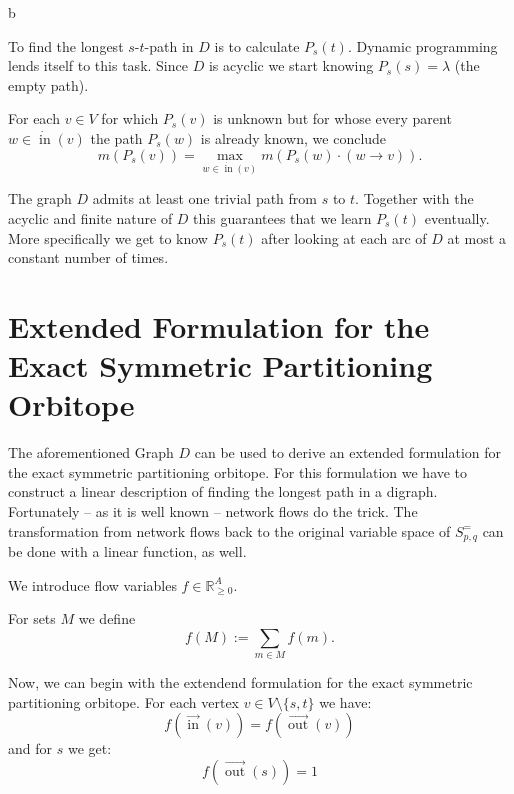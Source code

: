 b\documentclass[a4paper]{amsart}
\theoremstyle{definition}
\DeclareMathOperator{\In}{in}
\DeclareMathOperator{\Out}{out}
\newcommand{\ina}{\ensuremath{\vec{\In}}}
\newcommand{\outa}{\ensuremath{\vec{\Out}}}
\newcommand{\inv}{\ensuremath{\dot{\In}}}
\begin{document}
To find the longest \(s\)-\(t\)-path in \(D\) is to calculate
\(P_s (t)\).  Dynamic programming lends itself to this task.  Since
\(D\) is acyclic we start knowing \(P_s (s) = \lambda\) (the empty path).

For each \(v \in V\) for which \(P_s (v)\) is unknown but for whose
every parent \(w \in \inv(v)\) the path \(P_s (w)\) is already known,
we conclude
\[m\left(P_s \left(v\right)\right) = \max_{w \in \inv(v)}
m\left(P_s(w) \cdot \left(w \rightarrow v \right) \right)\text{.}\]

The graph \(D\) admits at least one trivial path from \(s\) to \(t\).
Together with the acyclic and finite nature of \(D\) this guarantees
that we learn \(P_s (t)\) eventually.  More specifically we get to
know \(P_s (t)\) after looking at each arc of \(D\) at most a constant
number of times.





\section{Extended Formulation for the Exact Symmetric Partitioning Orbitope}
The aforementioned Graph \(D\) can be used to derive an extended
formulation for the exact symmetric partitioning orbitope.  For this
formulation we have to construct a linear description of finding the
longest path in a digraph.  Fortunately -- as it is well known --
network flows do the trick.  The transformation from network flows
back to the original variable space of \(S^=_{p,q}\) can be done with
a linear function, as well.

We introduce flow variables \(f \in \mathbb{R}^A_{\geq 0}\).  

For sets \(M\) we define
\[f (M) := \sum_{m\in M} f(m)\text{.}\]

Now, we can begin with the extendend formulation for the exact
symmetric partitioning orbitope.  For each vertex \(v \in V \setminus
\{s,t\}\) we have:
\begin{equation}
f\left(\ina(v)\right) = f\left(\outa(v)\right)
\end{equation}
and for \(s\) we get:
\begin{equation}
f\left(\outa(s)\right) = 1
\end{equation}
\end{document}
